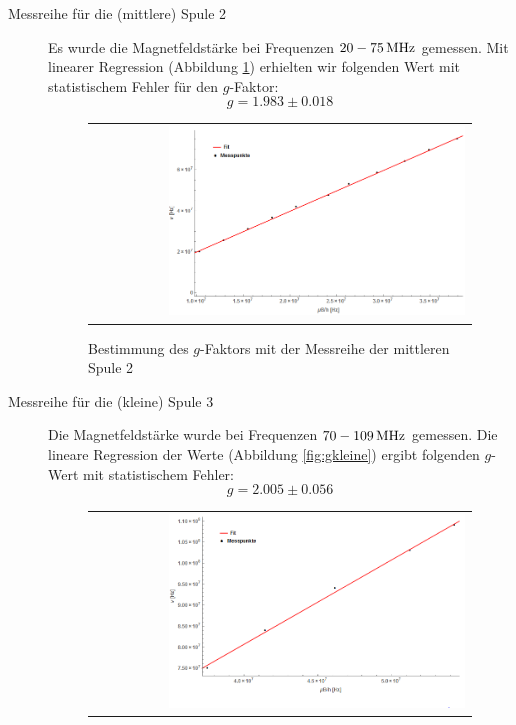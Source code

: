 \documentclass[a4paper,titlepage]{scrartcl}
\numberwithin{equation}{section}
\begin{document}
\begin{description}
\item[Messreihe für die (mittlere) Spule 2] Es wurde die Magnetfeldstärke bei Frequenzen $\unit[20-75]{MHz}$ gemessen. Mit linearer Regression (Abbildung \ref{fig:gmittlere}) erhielten wir folgenden Wert mit statistischem Fehler für den $g$-Faktor:
\begin{equation*}
g=1.983 \pm 0.018
\end{equation*}
\begin{figure}[H]
	\centering
	\begin{tabular}{@{}r@{}}
		\includegraphics[width=0.8\textwidth]{images/gmittlere.png}\\
	\end{tabular}
	\caption{Bestimmung des $g$-Faktors mit der Messreihe der mittleren Spule 2}
    \label{fig:gmittlere}
\end{figure}
\item[Messreihe für die (kleine) Spule 3] Die Magnetfeldstärke wurde bei Frequenzen $\unit[70-109]{MHz}$ gemessen. Die lineare Regression der Werte (Abbildung \ref{fig:gkleine}) ergibt folgenden $g$-Wert mit statistischem Fehler:
\begin{equation*}
g=2.005 \pm 0.056
\end{equation*}
\begin{figure}[H]
	\centering
	\begin{tabular}{@{}r@{}}
		\includegraphics[width=0.8\textwidth]{images/gkleine.png}\\

\end{tabular}
\end{figure}
\end{description}
\end{document}
